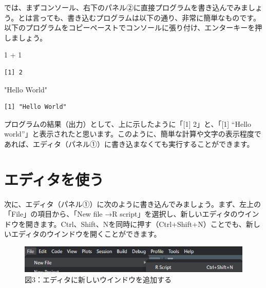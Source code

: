 \documentclass[
  letterpaper,
  DIV=11,
  numbers=noendperiod]{scrreprt}
\newenvironment{Shaded}{\begin{snugshade}}{\end{snugshade}}
\newcommand{\DecValTok}[1]{\textcolor[rgb]{0.68,0.00,0.00}{#1}}
\newcommand{\SpecialCharTok}[1]{\textcolor[rgb]{0.37,0.37,0.37}{#1}}
\newcommand{\StringTok}[1]{\textcolor[rgb]{0.13,0.47,0.30}{#1}}
\begin{document}
では、まずコンソール、右下のパネル②に直接プログラムを書き込んでみましょう。とは言っても、書き込むプログラムは以下の通り、非常に簡単なものです。以下のプログラムをコピーペーストでコンソールに張り付け、エンターキーを押しましょう。

\begin{Shaded}
\begin{Highlighting}[]
\DecValTok{1} \SpecialCharTok{+} \DecValTok{1}
\end{Highlighting}
\end{Shaded}

\begin{verbatim}
[1] 2
\end{verbatim}

\begin{Shaded}
\begin{Highlighting}[]
\StringTok{"Hello World"}
\end{Highlighting}
\end{Shaded}

\begin{verbatim}
[1] "Hello World"
\end{verbatim}

プログラムの結果（出力）として、上に示したように「{[}1{]}
2」と、「{[}1{]} ``Hello
world''」と表示されたと思います。このように、簡単な計算や文字の表示程度であれば、エディタ（パネル①）に書き込まなくても実行することができます。

\hypertarget{ux30a8ux30c7ux30a3ux30bfux3092ux4f7fux3046}{%
\section{エディタを使う}\label{ux30a8ux30c7ux30a3ux30bfux3092ux4f7fux3046}}

次に、エディタ（パネル①）に次のように書き込んでみましょう。まず、左上の「File」の項目から、「New
file →R
script」を選択し、新しいエディタのウインドウを開きます。Ctrl、Shift、Nを同時に押す（Ctrl+Shift+N）ことでも、新しいエディタのウインドウを開くことができます。

\begin{figure}

{\centering \includegraphics{././image/file_Rscript.png}

}

\caption{図3：エディタに新しいウインドウを追加する}

\end{figure}
\end{document}

